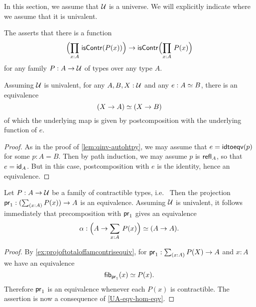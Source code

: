 In this section, we assume that $\type$ is a universe.
We will explicitly indicate where we assume that it is univalent.

\begin{defn}\label{weakfunext}
The 
%
%
asserts that there is a function
\begin{equation*}
\Parens{\prd{x:A}\iscontr(P(x))} \to\iscontr\Parens{\prd{x:A}P(x)}
\end{equation*}
for any family $P:A\to\type$ of types over any type $A$.
\end{defn}

\begin{lem} \label{UA-eqv-hom-eqv}
Assuming $\type$ is univalent, for any $A,B,X:\type$ and any $e:\eqv{A}{B}$, there is an equivalence
\begin{equation*}
\eqv{(X\to A)}{(X\to B)}
\end{equation*}
of which the underlying map is given by postcomposition with the underlying function of $e$.
\end{lem}

\begin{proof}
  As in the proof of \autoref{lem:qinv-autohtpy}, we may assume that $e = \idtoeqv(p)$ for some $p:A=B$.
  Then by path induction, we may assume $p$ is $\refl{A}$, so that $e = \idfunc[A]$.
  But in this case, postcomposition with $e$ is the identity, hence an equivalence.
\end{proof}

\begin{cor}\label{contrfamtotalpostcompequiv}
Let $P:A\to\type$ be a family of contractible types, i.e.\ 
Then the projection $\proj{1}:(\sm{x:A}P(x))\to A$ is an equivalence. Assuming $\type$ is univalent, it follows immediately that precomposition with $\proj{1}$ gives an equivalence
\begin{equation*}
\alpha : \eqv{\Parens{A\to\sm{x:A}P(x)}}{(A\to A)}.
\end{equation*}
\end{cor}

\begin{proof}
  By \autoref{ex:projoftotaloffamcontrisequiv}, for $\proj{1}:\sm{x:A}P(X)\to A$ and $x:A$ we have an equivalence
  \begin{equation*}
    \eqv{\hfiber{\proj{1}}{x}}{P(x)}.
  \end{equation*}
  Therefore $\proj{1}$ is an equivalence whenever each $P(x)$ is contractible. The assertion is now a consequence of  \autoref{UA-eqv-hom-eqv}.
\end{proof}

